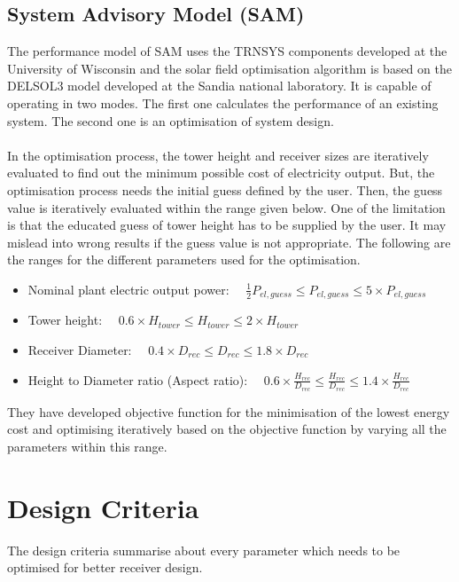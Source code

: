 \subsection{System Advisory Model (SAM) \cite{Wagner.2008}}
The performance model of SAM uses the TRNSYS components developed at the University of Wisconsin and the solar field optimisation algorithm is based on the DELSOL3 model developed at the Sandia national laboratory. It is capable of operating in two modes. The first one calculates the performance of an existing system. The second one is an optimisation of system design. \\\\
In the optimisation process, the tower height and receiver sizes are iteratively evaluated to find out the minimum possible cost of electricity output. But, the optimisation process needs the initial guess defined by the user. Then, the guess value is iteratively evaluated within the range given below. One of the limitation is that the educated guess of tower height has to be supplied by the user. It may mislead into wrong results if the guess value is not appropriate. The following are the ranges for the different parameters used for the optimisation.
\begin{itemize}
	\item Nominal plant electric output power: $ \quad  \frac{1}{2}P_{el,guess}\le P_{el,guess} \le 5 \times P_{el,guess} $
	\item Tower height: $ \quad  0.6 \times H_{tower} \le H_{tower} \le 2 \times H_{tower} $
	\item Receiver Diameter: $ \quad  0.4 \times D_{rec}\le D_{rec} \le 1.8 \times D_{rec} $
	\item Height to Diameter ratio (Aspect ratio): $ \quad 0.6 \times \frac{H_{rec}}{D_{rec}}\le \frac{H_{rec}}{D_{rec}} \le 1.4 \times \frac{H_{rec}}{D_{rec}} $ 
\end{itemize}
They have developed objective function for the minimisation of the lowest energy cost and optimising iteratively based on the objective function by varying all the parameters within this range.

\section{Design Criteria}
The design criteria summarise about every parameter which needs to be optimised for better receiver design.
